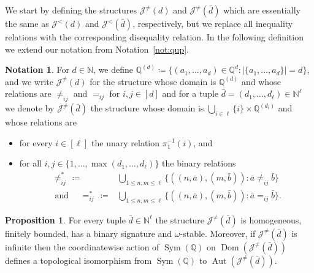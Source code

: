 \documentclass{amsart}
\theoremstyle{definition}
\newtheorem{notation}[theorem]{Notation}
\newtheorem{proposition}[theorem]{Proposition}
\theoremstyle{remark}
\numberwithin{equation}{section}
\newcommand\green[1]{\textcolor{green!50!black}{#1}}
\newcommand{\aut}{\operatorname{Aut}}
\newcommand{\sym}{\operatorname{Sym}}
\newcommand{\dom}{\operatorname{Dom}}
\newcommand{\typ}{\operatorname{tp}}
\newcommand\johnord[1]{\mathcal{J}^{<}(#1)}
\newcommand\johnneq[1]{\mathcal{J}^{\neq}(#1)}
\newcommand{\fa}{\mathfrak{A}}
\newcommand{\fb}{\mathfrak{B}}
\newcommand\qneq[1]{\mathbb{Q}^{(#1)}}
\begin{document}
	We start by defining the structures $\johnneq{d}$ and $\johnneq{\bar{d}}$ which are essentially the same as $\johnord{d}$ and $\johnord{\bar{d}}$, respectively, but we replace all inequality relations with the corresponding disequality relation.
	In the following definition we extend our notation from Notation~\ref{not:qup}.
    
    
	
\begin{notation} 
	{For $d \in {\mathbb N}$,} we define $\qneq{d}\coloneqq \{(a_1,\dots,a_d)\in \mathbb{Q}^d: |\{a_1,\dots,a_d\}|=d\}$, and we write $\johnneq{d}$ for the structure whose domain is $\qneq{d}$ and whose relations are $\neq_{ij}$ and $=_{ij}$ for $i,j\in [d]$ and for a tuple $\bar{d}=(d_1,\dots,d_{\ell})\in {\mathbb N}^{\ell}$ we denote by $\johnneq{\bar{d}}$ the structure whose domain is $\bigcup_{i\in \ell}{\{i\}\times \qneq{d_i}}$ and whose relations are 

\begin{itemize}
        \item for every $i\in [\ell]$ the unary relation $\pi_1^{-1}(i)$, and 
        \item for all $i,j\in \{1,\dots,\max(d_1,\dots,d_{\ell})\}$ the binary relations 
\begin{align*}
\neq^*_{ij}\, \coloneqq& \bigcup_{1\leq n,m\leq \ell}\{((n,\bar{a}),(m,\bar{b})): \bar{a}\neq_{ij}\bar{b}\} \\
\text{ and } \quad =^*_{ij}\, \coloneqq& \bigcup_{1\leq n,m\leq \ell}\{((n,\bar{a}),(m,\bar{b})): \bar{a}=_{ij}\bar{b}\}.
\end{align*}
    \end{itemize}
    
\end{notation}

	
\begin{proposition}\label{johnhomneq}
	For every tuple $\bar{d}\in \mathbb{N}^{\ell}$ the structure $\johnneq{\bar{d}}$ is homogeneous, finitely bounded, has a binary signature and $\omega$-stable. Moreover, {if $\johnneq{\bar{d}}$ is infinite then} the coordinatewise action of $\sym(\mathbb{Q})$ on $\dom(\johnneq{\bar{d}})$ defines a topological isomorphism from $\sym(\mathbb{Q})$ to $\aut(\johnneq{\bar{d}})$.
\end{proposition}
\end{document}
